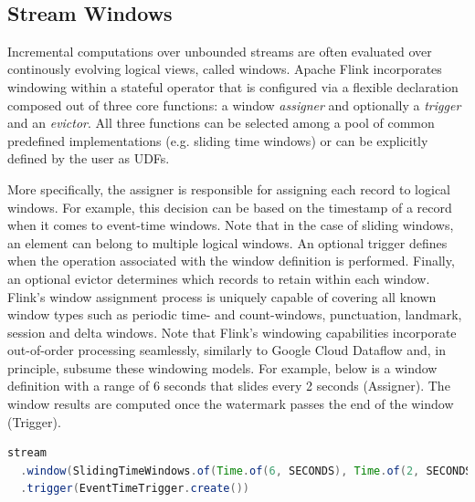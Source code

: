 \documentclass[11pt]{article}
\begin{document}
 

\subsection{Stream Windows}
Incremental computations over unbounded streams are often evaluated over continously evolving logical views, called windows. Apache Flink incorporates windowing within a stateful operator that is configured via a flexible declaration composed out of three core functions: a window \textit{assigner} and optionally a \textit{trigger} and an \textit{evictor}. All three functions can be selected among a pool of common predefined implementations (e.g. sliding time windows) or can be explicitly defined by the user as UDFs.

More specifically, the assigner is responsible for assigning each record to logical windows. For example, this decision can be based on the timestamp of a record when it comes to event-time windows. Note that in the case of sliding windows, an element can belong to multiple logical windows. An optional trigger defines when the operation associated with the window definition is performed. Finally, an optional evictor determines which records to retain within each window. Flink's window assignment process is uniquely capable of covering all known window types such as periodic time- and count-windows, punctuation, landmark, session and delta windows. Note that Flink's windowing capabilities incorporate out-of-order processing seamlessly, similarly to Google Cloud Dataflow \cite{akidau2015dataflow} and, in principle, subsume these windowing models. For example, below is a window definition with a range of 6 seconds that slides every 2 seconds (Assigner). The window results are computed once the watermark passes the end of the window (Trigger).

\begin{lstlisting}[language=Java]
stream
  .window(SlidingTimeWindows.of(Time.of(6, SECONDS), Time.of(2, SECONDS))
  .trigger(EventTimeTrigger.create())
\end{lstlisting}
\end{document}

